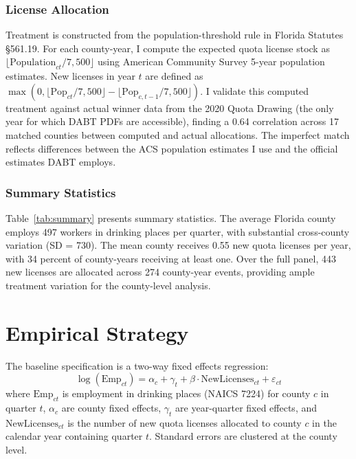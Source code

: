 \documentclass[12pt]{article}
\begin{document}
\subsubsection*{License Allocation} Treatment is constructed from the population-threshold rule in Florida Statutes \S561.19. For each county-year, I compute the expected quota license stock as $\lfloor \text{Population}_{ct} / 7{,}500 \rfloor$ using American Community Survey 5-year population estimates. New licenses in year $t$ are defined as $\max(0, \lfloor \text{Pop}_{ct}/7{,}500 \rfloor - \lfloor \text{Pop}_{c,t-1}/7{,}500 \rfloor)$. I validate this computed treatment against actual winner data from the 2020 Quota Drawing (the only year for which DABT PDFs are accessible), finding a 0.64 correlation across 17 matched counties between computed and actual allocations. The imperfect match reflects differences between the ACS population estimates I use and the official estimates DABT employs.

\subsubsection*{Summary Statistics} Table~\ref{tab:summary} presents summary statistics. The average Florida county employs 497 workers in drinking places per quarter, with substantial cross-county variation (SD = 730). The mean county receives 0.55 new quota licenses per year, with 34 percent of county-years receiving at least one. Over the full panel, 443 new licenses are allocated across 274 county-year events, providing ample treatment variation for the county-level analysis.



\section{Empirical Strategy}

The baseline specification is a two-way fixed effects regression:
\begin{equation}
\log(\text{Emp}_{ct}) = \alpha_c + \gamma_t + \beta \cdot \text{NewLicenses}_{ct} + \varepsilon_{ct}
\label{eq:main}
\end{equation}
where $\text{Emp}_{ct}$ is employment in drinking places (NAICS 7224) for county $c$ in quarter $t$, $\alpha_c$ are county fixed effects, $\gamma_t$ are year-quarter fixed effects, and $\text{NewLicenses}_{ct}$ is the number of new quota licenses allocated to county $c$ in the calendar year containing quarter $t$. Standard errors are clustered at the county level.
\end{document}
